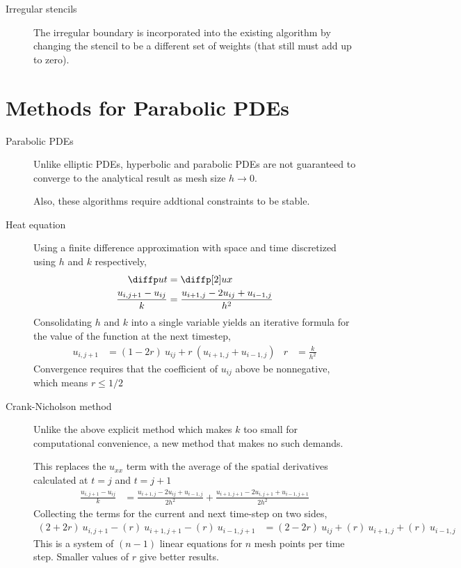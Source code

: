 \begin{description}
    \item[Irregular stencils] The irregular boundary is incorporated into the existing
        algorithm by changing the stencil to be a different set of weights (that still
        must add up to zero).
\end{description}

\section{Methods for Parabolic PDEs}

\begin{description}
    \item[Parabolic PDEs] Unlike elliptic PDEs, hyperbolic and parabolic PDEs are not
        guaranteed to converge to the analytical result as mesh size $ h \to 0 $. \par
        Also, these algorithms require addtional constraints to be stable.

    \item[Heat equation] Using a finite difference approximation with space and time
        discretized using $ h $ and $ k $ respectively,
        \begin{align}
            \diffp ut                    & = \diffp[2] ux                           \\
            \frac{u_{i,j+1} - u_{ij}}{k} & = \frac{u_{i+1,j} - 2u_{ij} + u_{i-1,j}}
            {h^2}
        \end{align}
        Consolidating $ h $ and $ k $ into a single variable yields an iterative formula
        for the value of the function at the next timestep,
        \begin{align}
            u_{i,j+1} & = (1-2r)\ u_{ij} + r\ (u_{i+1,j} + u_{i-1,j}) &
            r         & = \frac{k}{h^2}
        \end{align}
        Convergence requires that the coefficient of $ u_{ij} $ above be nonnegative,
        which means $ r \leq 1/2$

    \item[Crank-Nicholson method] Unlike the above explicit method which makes $ k $
        too small for computational convenience, a new method that makes no such demands.
        \par
        This replaces the $ u_{xx} $ term with the average of the spatial derivatives
        calculated at $ t=j $ and $ t = j+1 $
        \begin{align}
            \frac{u_{i,j+1} - u_{ij}}{k} & = \frac{u_{i+1,j} - 2u_{ij} + u_{i-1,j}}
            {2h^2} + \frac{u_{i+1,j+1} - 2u_{i,j+1} + u_{i-1,j+1}}
            {2h^2}
        \end{align}
        Collecting the terms for the current and next time-step on two sides,
        \begin{align}
            (2 + 2r)\ u_{i,j+1} - (r)\ u_{i+1,j+1} - (r)\ u_{i-1,j+1}
             & = (2 - 2r)\ u_{ij} + (r)\ u_{i+1,j} + (r)\ u_{i-1,j}
        \end{align}
        This is a system of $ (n-1) $ linear equations for $ n $ mesh points per time
        step. Smaller values of $ r $ give better results.


\end{description}
